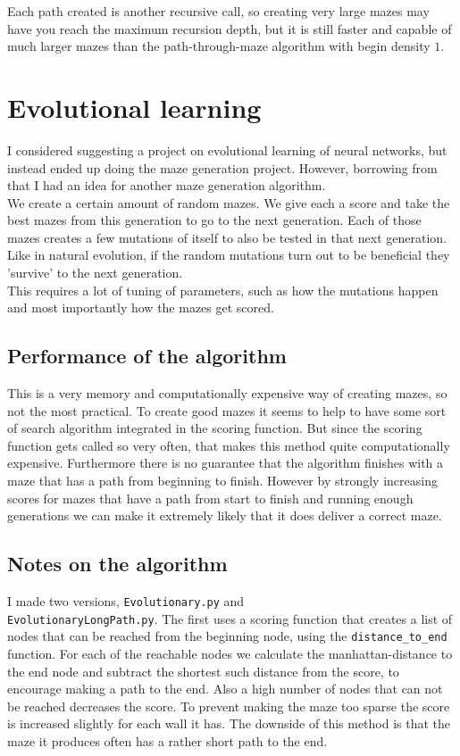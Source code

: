 \documentclass[10pt, a4paper, twoside]{amsart}
\newcommand{\1}{\mathbbm{1}}
\begin{document}
Each path created is another recursive call, so creating very large mazes may have you reach the maximum recursion depth, but it is still faster and capable of much larger mazes than the path-through-maze algorithm with begin density $1$.


\section{Evolutional learning}
I considered suggesting a project on evolutional learning of neural networks, but instead ended up doing the maze generation project. However, borrowing from that I had an idea for another maze generation algorithm.\\
We create a certain amount of random mazes. We give each a score and take the best mazes from this generation to go to the next generation. Each of those mazes creates a few mutations of itself to also be tested in that next generation. Like in natural evolution, if the random mutations turn out to be beneficial they 'survive' to the next generation.\\
This requires a lot of tuning of parameters, such as how the mutations happen and most importantly how the mazes get scored.

\subsection{Performance of the algorithm}
This is a very memory and computationally expensive way of creating mazes, so not the most practical. To create good mazes it seems to help to have some sort of search algorithm integrated in the scoring function. But since the scoring function gets called so very often, that makes this method quite computationally expensive.
Furthermore there is no guarantee that the algorithm finishes with a maze that has a path from beginning to finish. However by strongly increasing scores for mazes that have a path from start to finish and running enough generations we can make it extremely likely that it does deliver a correct maze.

\subsection{Notes on the algorithm}
I made two versions, \verb+Evolutionary.py+ and\\ \verb+EvolutionaryLongPath.py+.
The first uses a scoring function that creates a list of nodes that can be reached from the beginning node, using the \verb+distance_to_end+ function. For each of the reachable nodes we calculate the manhattan-distance to the end node and subtract the shortest such distance from the score, to encourage making a path to the end. Also a high number of nodes that can not be reached decreases the score. To prevent making the maze too sparse the score is increased slightly for each wall it has. The downside of this method is that the maze it produces often has a rather short path to the end.\\
\end{document}

